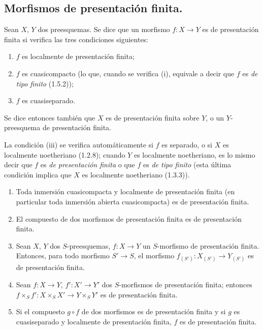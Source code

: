 \subsection{Morfismos de presentación finita.}
\label{subsection:IV.1.6-fr}

\begin{definition}[1.6.1]
\label{IV.1.6.1-fr}
Sean $X$, $Y$ dos preesquemas. Se dice que un morfismo $f:X\to Y$ es
de presentación finita si verifica las tres condiciones siguientes:
\begin{enumerate}
  \item[\textup{(i)}] $f$ es localmente de presentación finita;
  \item[\textup{(ii)}] $f$ es cuasicompacto \textup{(lo que, cuando se verifica (i),
  equivale a decir que $f$ es \emph{de tipo finito} (1.5.2))};
  \item[\textup{(iii)}] $f$ es cuasiseparado.
\end{enumerate}
Se dice entonces también que $X$ es de presentación finita sobre $Y$, o un
$Y$-preesquema de presentación finita.
\end{definition}

La condición (iii) se verifica automáticamente si $f$ es separado, o si $X$
es localmente noetheriano (1.2.8); cuando $Y$ es localmente noetheriano,
es lo mismo decir que $f$ es \emph{de presentación finita} o que $f$
es \emph{de tipo finito} (esta última condición implica que $X$ es
localmente noetheriano (1.3.3)).


\begin{proposition}[1.6.2]
\label{IV.1.6.2-fr}
\begin{enumerate}
  \item[\textup{(i)}] Toda inmersión cuasicompacta y localmente de presentación
  finita (en particular toda inmersión abierta cuasicompacta) es de
  presentación finita.
  \item[\textup{(ii)}] El compuesto de dos morfismos de presentación finita es de
  presentación finita.
  \item[\textup{(iii)}] Sean $X$, $Y$ dos $S$-preesquemas, $f:X\to Y$ un
  $S$-morfismo de presentación finita. Entonces, para todo morfismo $S'\to S$,
  el morfismo $f_{(S')}:X_{(S')}\to Y_{(S')}$ es de presentación finita.
  \item[\textup{(iv)}] Sean $f:X\to Y$, $f':X'\to Y'$ dos $S$-morfismos de
  presentación finita; entonces
  $f\times_Sf':X\times_SX'\to Y\times_SY'$ es de presentación finita.
  \item[\textup{(v)}] Si el compuesto $g\circ f$ de dos morfismos es de presentación
  finita y si $g$ es cuasiseparado y localmente de presentación finita, $f$
  es de presentación finita.
\end{enumerate}
\end{proposition}

